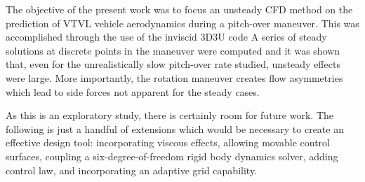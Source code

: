 \documentclass[cover]{aiaa}%
\begin{document}
The objective of the present work was to focus an unsteady CFD
method on the prediction of VTVL vehicle aerodynamics during a
pitch-over maneuver.  This was accomplished through the use of
the inviscid 3D3U code\cite{batina:93aij} A series of steady
solutions at discrete points in the maneuver were computed and it
was shown that, even for the unrealistically slow pitch-over rate
studied, unsteady effects were large.  More importantly, the
rotation maneuver creates flow asymmetries which lead to side
forces not apparent for the steady cases.

As this is an exploratory study, there is certainly room for
future work. The following is just a handful of extensions which
would be necessary to create an effective design tool:
incorporating viscous effects, allowing movable control surfaces,
coupling a six-degree-of-freedom rigid body dynamics solver,
adding control law, and incorporating an adaptive grid
capability.



\end{document}
